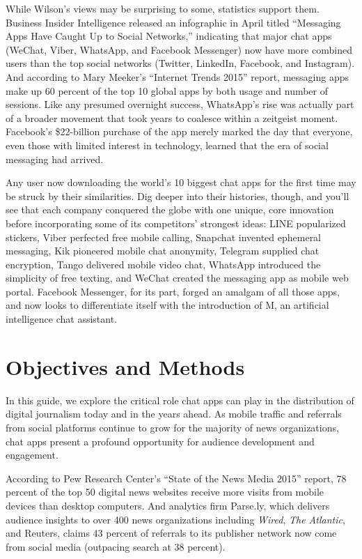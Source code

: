 \documentclass[notoc, symmetric, nobib, nols]{towcenter-guideto-book}
\begin{document}
While Wilson's views may be surprising to some, statistics support them. Business Insider Intelligence released an infographic in April titled ``Messaging Apps Have Caught Up to Social Networks,'' indicating that major chat apps (WeChat, Viber, WhatsApp, and Facebook Messenger) now have more combined users than the top social networks (Twitter, LinkedIn, Facebook, and Instagram).\autocite{BIchatapps} And according to Mary Meeker's ``Internet Trends 2015'' report, messaging apps make up 60 percent of the top 10 global apps by both usage and number of sessions.\autocite{Meeker2015}
\newpage
Like any presumed overnight success, WhatsApp's rise was actually part of a broader movement that took years to coalesce within a zeitgeist moment. Facebook's \$22-billion purchase of the app merely marked the day that everyone, even those with limited interest in technology, learned that the era of social messaging had arrived.  

Any user now downloading the world's 10 biggest chat apps for the first time may be struck by their similarities. Dig deeper into their histories, though, and you'll see that each company conquered the globe with one unique, core innovation before incorporating some of its competitors' strongest ideas: LINE popularized stickers, Viber perfected free mobile calling, Snapchat invented ephemeral messaging, Kik pioneered mobile chat anonymity, Telegram supplied chat encryption, Tango delivered mobile video chat, WhatsApp introduced the simplicity of free texting, and WeChat created the messaging app as mobile web portal. Facebook Messenger, for its part, forged an amalgam of all those apps, and now looks to differentiate itself with the introduction of M, an artificial intelligence chat assistant.




\section{Objectives and Methods}

In this guide, we explore the critical role chat apps can play in the distribution of digital journalism today and in the years ahead. As mobile traffic and referrals from social platforms continue to grow for the majority of news organizations, chat apps present a profound opportunity for audience development and engagement. 

According to Pew Research Center's ``State of the News Media 2015'' report, 78 percent of the top 50 digital news websites receive more visits from mobile devices than desktop computers. And analytics firm Parse.ly, which delivers audience insights to over 400 news organizations including \textit{Wired}, \textit{The Atlantic}, and Reuters, claims 43 percent of referrals to its publisher network now come from social media (outpacing search at 38 percent).  
\end{document}
